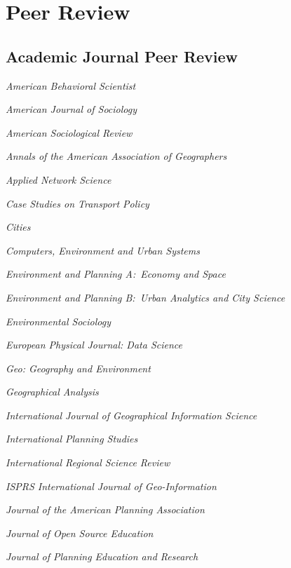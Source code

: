 \documentclass[11pt,letterpaper]{report}
\newcommand{\listitemspace}{0.25em}
\renewenvironment{itemize}
{\begin{list}{}{\setlength{\leftmargin}{0em}
                \setlength{\parskip}{0em}
                \setlength{\itemsep}{\listitemspace}
                \setlength{\parsep}{\listitemspace}}}
{\end{list}}
\begin{document}
    \section*{Peer Review}

    \subsection*{Academic Journal Peer Review}

    \begin{itemize}

        \item \textit{American Behavioral Scientist}
        \item \textit{American Journal of Sociology}
        \item \textit{American Sociological Review}
        \item \textit{Annals of the American Association of Geographers}
        \item \textit{Applied Network Science}
        \item \textit{Case Studies on Transport Policy}
        \item \textit{Cities}
        \item \textit{Computers, Environment and Urban Systems}
        \item \textit{Environment and Planning A:\ Economy and Space}
        \item \textit{Environment and Planning B:\ Urban Analytics and City Science}
        \item \textit{Environmental Sociology}
        \item \textit{European Physical Journal: Data Science}
        \item \textit{Geo: Geography and Environment}
        \item \textit{Geographical Analysis}
        \item \textit{International Journal of Geographical Information Science}
        \item \textit{International Planning Studies}
        \item \textit{International Regional Science Review}
        \item \textit{ISPRS International Journal of Geo-Information}
        \item \textit{Journal of the American Planning Association}
        \item \textit{Journal of Open Source Education}
        \item \textit{Journal of Planning Education and Research}

\end{itemize}
\end{document}
